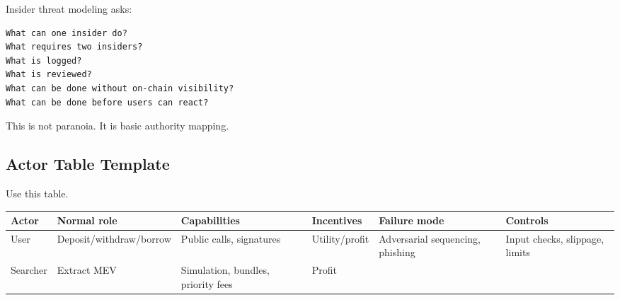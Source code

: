 Insider threat modeling asks:

\begin{lstlisting}
What can one insider do?
What requires two insiders?
What is logged?
What is reviewed?
What can be done without on-chain visibility?
What can be done before users can react?
\end{lstlisting}

This is not paranoia. It is basic authority mapping.

\subsection{Actor Table Template}

Use this table.

{\def\LTcaptype{none} %
\begin{longtable}[]{@{}
  >{\raggedright\arraybackslash}p{}
  >{\raggedright\arraybackslash}p{}
  >{\raggedright\arraybackslash}p{}
  >{\raggedright\arraybackslash}p{}
  >{\raggedright\arraybackslash}p{}
  >{\raggedright\arraybackslash}p{}@{}}
\toprule\noalign{}
\begin{minipage}[b]{\linewidth}\raggedright
Actor
\end{minipage} & \begin{minipage}[b]{\linewidth}\raggedright
Normal role
\end{minipage} & \begin{minipage}[b]{\linewidth}\raggedright
Capabilities
\end{minipage} & \begin{minipage}[b]{\linewidth}\raggedright
Incentives
\end{minipage} & \begin{minipage}[b]{\linewidth}\raggedright
Failure mode
\end{minipage} & \begin{minipage}[b]{\linewidth}\raggedright
Controls
\end{minipage} \\
\midrule\noalign{}
\endhead
\bottomrule\noalign{}
\endlastfoot
User & Deposit/withdraw/borrow & Public calls, signatures &
Utility/profit & Adversarial sequencing, phishing & Input checks,
slippage, limits \\
Searcher & Extract MEV & Simulation, bundles, priority fees & Profit &

\end{longtable}}
